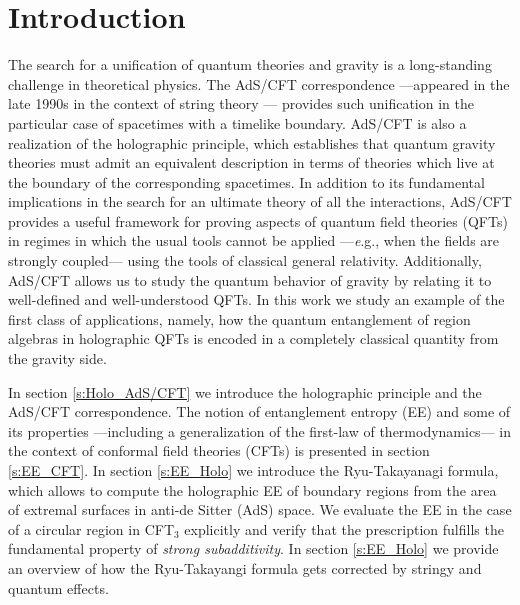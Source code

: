 \documentclass[twocolumn]{revtex4}
\begin{document}
\section{Introduction} \label{s:Intro}
The search for a unification of quantum theories and gravity is a long-standing challenge in theoretical physics. The AdS/CFT correspondence ---appeared in the late 1990s in the context of string theory \cite{maldacena_large_1999}--- provides such unification in the particular case of spacetimes with a timelike boundary. AdS/CFT is also a realization of the holographic principle, which establishes that quantum gravity theories must admit an equivalent description in terms of theories which live at the boundary of the corresponding spacetimes.  %
In addition to its fundamental implications in the search for an ultimate theory of all the interactions, AdS/CFT provides a useful framework for proving aspects of quantum field theories (QFTs) in regimes in which the usual tools cannot be applied ---{\emph e.g.,} when the fields are strongly coupled--- using the tools of classical general relativity. %
Additionally, AdS/CFT allows us to study the quantum behavior of gravity by relating it to well-defined and well-understood QFTs.
In this work we study an example of the first class of applications, namely, how the quantum entanglement of region algebras in holographic QFTs is encoded in a completely classical quantity from the gravity side.


In section \ref{s:Holo_AdS/CFT} we introduce the holographic principle and the AdS/CFT correspondence. The notion of entanglement entropy (EE) and some of its properties ---including a generalization of the first-law of thermodynamics--- in the context of conformal field theories (CFTs) is presented in section \ref{s:EE_CFT}. In section \ref{s:EE_Holo} we introduce the Ryu-Takayanagi formula, which allows to compute the holographic EE of boundary regions from the area of extremal surfaces in anti-de Sitter (AdS) space. We evaluate the EE in the case of a circular region in CFT$_3$ explicitly and verify that the prescription fulfills the fundamental property of {\it strong subadditivity}. In section \ref{s:EE_Holo} we provide an overview of how the Ryu-Takayangi formula gets corrected by stringy and quantum effects. 
\end{document}
